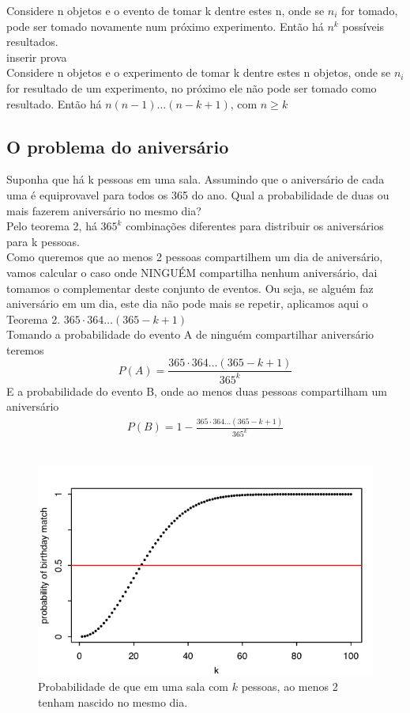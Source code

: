 \documentclass{article}
\begin{document}
Considere n objetos e o evento de tomar k dentre estes n, onde se $n_i$ for tomado, pode ser tomado novamente num próximo experimento. Então há $n^k$ possíveis resultados.
\\
inserir prova
\\

Considere n objetos e o experimento de tomar k dentre estes n objetos, onde se $n_i$ for resultado de um experimento, no próximo ele não pode ser tomado como resultado. Então há $n(n-1)\dots (n-k+1)$, com $n \geq k$

\subsection{O problema do aniversário}
Suponha que há k pessoas em uma sala. Assumindo que o aniversário de cada uma é equiprovavel para todos os 365 do ano. Qual a probabilidade de duas ou mais fazerem aniversário no mesmo dia?
\\
Pelo teorema 2, há $365^k$ combinações diferentes para distribuir os aniversários para k pessoas.\\
Como queremos que ao menos 2 pessoas compartilhem um dia de aniversário, vamos calcular o caso onde NINGUÉM compartilha nenhum aniversário, dai tomamos o complementar deste conjunto de eventos. Ou seja, se alguém faz aniversário em um dia, este dia não pode mais se repetir, aplicamos aqui o Teorema 2.
$365\cdot 364 \dots (365-k+1)$
\\
Tomando a probabilidade do evento A de ninguém compartilhar aniversário teremos
$$
P(A) = \frac{365\cdot 364 \dots (365-k+1)}{365^k}
$$
E a probabilidade do evento B, onde ao menos duas pessoas compartilham um aniversário
\begin{align*}
 P(B) = 1 - \frac{365\cdot 364 \dots (365-k+1)}{365^k}
\end{align*}
\\
\begin{figure}[h]
    \centering    \includegraphics{fig1.png}
    \caption{Probabilidade de que em uma sala com $k$ pessoas, ao menos 2 tenham nascido no mesmo dia.}
    \label{fig:my_label}
\end{figure}
\end{document}
